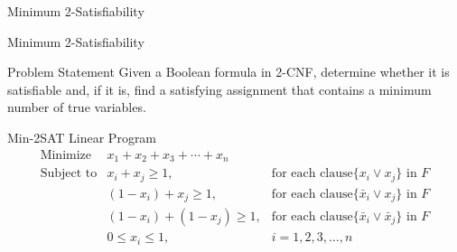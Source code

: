 \documentclass[xcolor=svgnames]{beamer}
\begin{document}
\begin{section}{Minimum 2-Satisfiability}
    \begin{frame}{Minimum 2-Satisfiability}
        \small
        \begin{block}{Problem Statement}
            Given a Boolean formula in 2-CNF, determine whether it is satisfiable and, if it is, find a satisfying assignment that contains a minimum number of true variables.
        \end{block}
        \begin{exampleblock}{Min-2SAT Linear Program}
            \[
                \begin{array}{lll}
                    \text{Minimize} & x_1 +  x_2 +  x_3 + \cdots + x_n \\[10pt]
                    \text{Subject to} & x_i + x_j \geq 1, \quad \quad \quad \quad \quad & \text{for each clause}\{x_i\lor x_j\} \text{ in } F \\[10pt]
                    & (1-x_i )+ x_j \geq 1, \quad \quad & \text{for each clause}\{\bar{x}_i\lor x_j\} \text{ in } F \\[10pt]
                    & (1-x_i) + (1-x_j) \geq 1, & \text{for each clause}\{\bar{x}_i\lor \bar{x}_j\} \text{ in } F \\[10pt]
                    & 0 \leq x_i \leq  1, \quad & i = 1, 2, 3, \dots, n
                

\end{array}\]
\end{exampleblock}
\end{frame}
\end{section}
\end{document}
